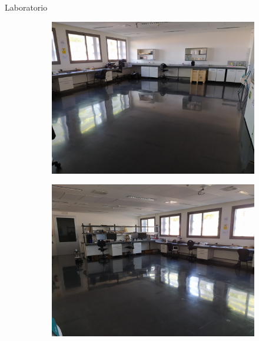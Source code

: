 \documentclass{beamer}
\begin{document}
  \begin{frame}{Laboratorio}
    \begin{figure}[H]
      \begin{subfigure}[b]{.45\textwidth}
        \centering
        \includegraphics[width=\textwidth]{pic/lab1.jpg}
        \label{fig:foto_lab1}
      \end{subfigure}
      \begin{subfigure}[b]{.45\textwidth}
        \centering
        \includegraphics[width=\textwidth]{pic/lab2.jpg}
        \label{fig:foto_lab2}
      \end{subfigure}
      \label{fig:foto_lab}
    \end{figure}
  \end{frame}
\end{document}
